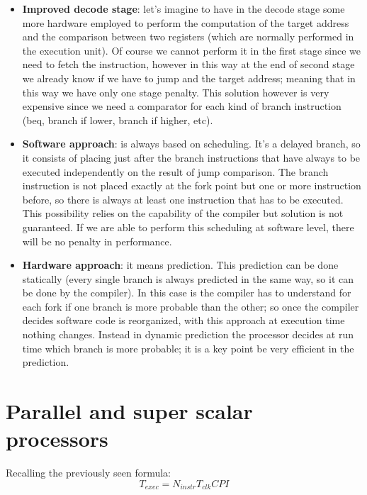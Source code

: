 \begin{itemize}
  \item \textbf{Improved decode stage}: let's imagine to have in the decode stage some more hardware employed to perform the computation of the target address and the comparison between two registers (which are normally performed in the execution unit). Of course we cannot perform it in the first stage since we need to fetch the instruction, however in this way at the end of second stage we already know if we have to jump and the target address; meaning that in this way we have only one stage penalty. This solution however is very expensive since we need a comparator for each kind of branch instruction (beq, branch if lower, branch if higher, etc).

  \item \textbf{Software approach}: is always based on scheduling. It's a delayed branch, so it consists of placing just after the branch instructions that have always to be executed independently on the result of jump comparison. The branch instruction is not placed exactly at the fork point but one or more instruction before, so there is always at least one instruction that has to be executed. This possibility relies on the capability of the compiler but solution is not guaranteed. If we are able to perform this scheduling at software level, there will be no penalty in performance.

  \item \textbf{Hardware approach}: it means prediction. This prediction can be done statically (every single branch is always predicted in the same way, so it can be done by the compiler). In this case is the compiler has to understand for each fork if one branch is more probable than the other; so once the compiler decides software code is reorganized, with this approach at execution time nothing changes. Instead in dynamic prediction the processor decides at run time which branch is more probable; it is a key point be very efficient in the prediction.
\end{itemize}

\chapter{Parallel and super scalar processors}

Recalling the previously seen formula:
$$T_{exec}=N_{instr}T_{clk} CPI$$

